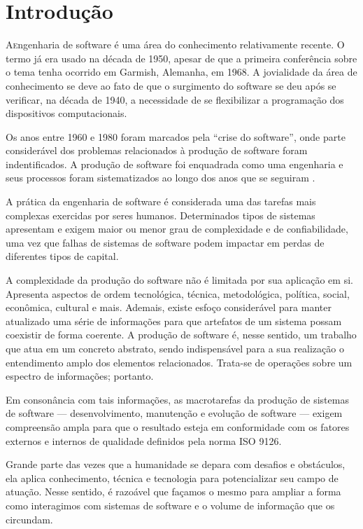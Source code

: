 
\section{Introdução}

\lettrine{A} engenharia de software é uma área do conhecimento relativamente
recente. O termo já era usado na década de 1950, apesar de que a primeira
conferência sobre o tema tenha ocorrido em Garmish, Alemanha, em 1968. A
jovialidade da área de conhecimento se deve ao fato de que o surgimento do
software se deu após se verificar, na década de 1940, a necessidade de se
flexibilizar a programação dos dispositivos computacionais\cite{Wazlawick2013}.

Os anos entre 1960 e 1980 foram marcados pela ``crise do software'', onde parte
considerável dos problemas relacionados à produção de software foram
indentificados. A produção de software foi enquadrada como uma engenharia e seus
processos foram sistematizados ao longo dos anos que se seguiram
\cite{Wazlawick2013}.

A prática da engenharia de software é considerada uma das tarefas mais complexas
exercidas por seres humanos\cite{Crockford2008}. Determinados tipos de sistemas
apresentam e exigem maior ou menor grau de complexidade e de confiabilidade, uma
vez que falhas de sistemas de software podem impactar em perdas de diferentes
tipos de capital.

A complexidade da produção do software não é limitada por sua aplicação em si.
Apresenta aspectos de ordem tecnológica, técnica, metodológica, política,
social, econômica, cultural e mais. Ademais, existe esfoço considerável para
manter atualizado uma série de informações para que artefatos de um sistema
possam coexistir de forma coerente. A produção de software é, nesse sentido,
um trabalho que atua em um concreto abstrato, sendo indispensável para a sua
realização o entendimento amplo dos elementos relacionados. Trata-se de
operações sobre um espectro de informações; portanto.

Em consonância com tais informações, as macrotarefas da produção de sistemas de
software --- desenvolvimento, manutenção e evolução de software --- exigem
compreensão ampla para que o resultado esteja em conformidade com os fatores
externos e internos de qualidade definidos pela norma ISO 9126\cite{ISOIEC9126}.

Grande parte das vezes que a humanidade se depara com desafios e obstáculos,
ela aplica conhecimento, técnica e tecnologia para potencializar seu campo de
atuação. Nesse sentido, é razoável que façamos o mesmo para ampliar a forma como
interagimos com sistemas de software e o volume de informação que os circundam.
